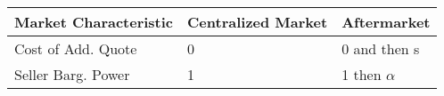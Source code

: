 \begin{table}[h!]
\centering
\label{tab:market_comparison}
\begin{tabular}{lll}
\toprule
\textbf{Market Characteristic} & \textbf{Centralized Market} & \textbf{Aftermarket} \\
\midrule
Cost of Add. Quote & 0 & 0 and then s \\
Seller Barg. Power & 1 & 1 then $\alpha$ \\
\bottomrule
\end{tabular}
\end{table}


